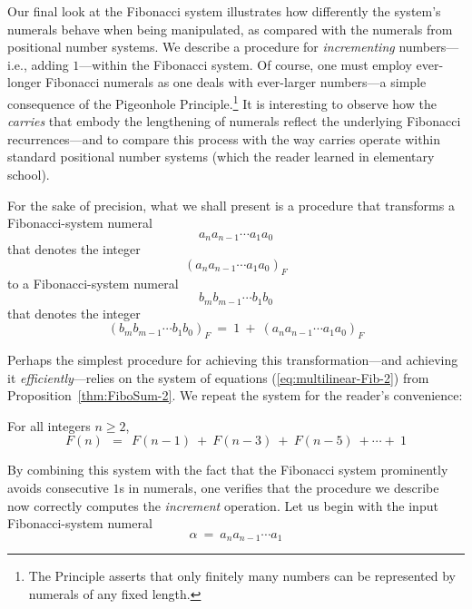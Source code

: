Our final look at the Fibonacci system illustrates how differently the system's numerals behave  when being manipulated, as compared with the numerals from positional number systems.  We describe a procedure for {\em incrementing} numbers---i.e., adding $1$---within the Fibonacci system.  Of course, one must employ ever-longer Fibonacci numerals as one deals with ever-larger numbers---a simple consequence of the Pigeonhole Principle.\footnote{The Principle asserts that only finitely many numbers can be represented by numerals of any fixed length.}  It is interesting to observe how the {\em carries} that embody the lengthening of numerals reflect the underlying Fibonacci recurrences---and to compare this process with the way carries operate within standard positional number systems (which the reader learned in elementary school).


\smallskip

\noindent
For the sake of precision, what we shall present is a procedure that transforms a Fibonacci-system numeral
\[ a_n a_{n-1} \cdots a_1 a_0 \]
that denotes the integer
\[ (a_n a_{n-1} \cdots a_1 a_0)_F \]
to a Fibonacci-system numeral
\[ b_m b_{m-1} \cdots b_1 b_0 \]
that denotes the integer
\[ (b_m b_{m-1} \cdots b_1 b_0)_F \ = \ 1 \ + \ (a_n a_{n-1} \cdots a_1 a_0)_F \]

Perhaps the simplest procedure for achieving this transformation---and achieving it {\em efficiently}---relies on the system of equations (\ref{eq:multilinear-Fib-2}) from Proposition~\ref{thm:FiboSum-2}.  We repeat the system for the reader's convenience:

\medskip

\noindent For all integers $n \geq 2$,
\[
F(n) \ \ = \ \
F(n-1) \ + \ F(n-3) \ + \ F(n-5) \ + \cdots + \ 1
\]

\medskip

By combining this system with the fact that the Fibonacci system prominently avoids consecutive $1$s in numerals, one verifies that the procedure we describe now correctly computes the {\em increment} operation.  Let us begin with the input Fibonacci-system numeral
\[ \alpha \ = \  a_n a_{n-1} \cdots a_1 \]

\bigskip

